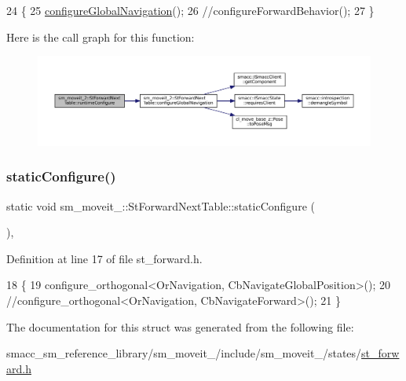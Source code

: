 \begin{DoxyCode}
24   \{
25     \hyperlink{structsm__moveit__2_1_1StForwardNextTable_a79b062960dd4f3b75464f3e47b87d79c}{configureGlobalNavigation}();
26     \textcolor{comment}{//configureForwardBehavior();}
27   \}
\end{DoxyCode}
Here is the call graph for this function\+:
\nopagebreak
\begin{figure}[H]
\begin{center}
\leavevmode
\includegraphics[width=350pt]{structsm__moveit__2_1_1StForwardNextTable_a313f56151794669eb8bebc1cc6a81014_cgraph}
\end{center}
\end{figure}
\mbox{\label{structsm__moveit__2_1_1StForwardNextTable_a95515e14c52417a9266b0c8f6ffc5bc4}} 
\subsubsection{\texorpdfstring{static\+Configure()}{staticConfigure()}}
{\footnotesize\ttfamily static void sm\+\_\+moveit\+\_\+::\+St\+Forward\+Next\+Table\+::static\+Configure (\begin{DoxyParamCaption}{ }\end{DoxyParamCaption})\hspace{0.3cm}{\ttfamily [inline]}, {\ttfamily [static]}}



Definition at line 17 of file st\+\_\+forward.\+h.


\begin{DoxyCode}
18   \{
19      configure\_orthogonal<OrNavigation, CbNavigateGlobalPosition>();
20     \textcolor{comment}{//configure\_orthogonal<OrNavigation, CbNavigateForward>();}
21   \}
\end{DoxyCode}


The documentation for this struct was generated from the following file\+:\begin{DoxyCompactItemize}
\item 
smacc\+\_\+sm\+\_\+reference\+\_\+library/sm\+\_\+moveit\+\_/include/sm\+\_\+moveit\+\_/states/\hyperlink{2_2include_2sm__moveit__2_2states_2st__forward_8h}{st\+\_\+forward.\+h}\end{DoxyCompactItemize}
